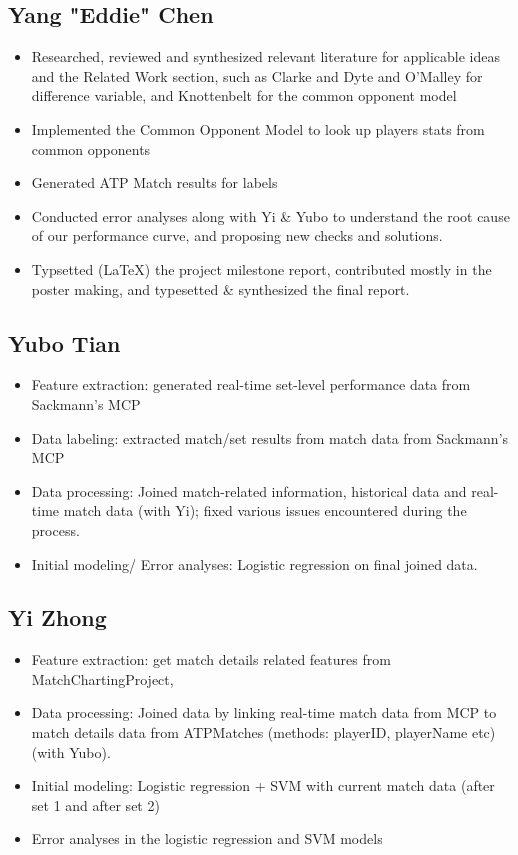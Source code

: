 \documentclass[paper=a4, fontsize=10pt]{scrartcl} %
\numberwithin{equation}{section} %
\numberwithin{figure}{section} %
\numberwithin{table}{section} %
\begin{document}
\subsection{Yang "Eddie" Chen}
\begin{itemize}
\item Researched, reviewed and synthesized relevant literature for applicable ideas and the Related Work section, such as Clarke and Dyte \cite{Clarke2010} and O'Malley \cite{omalley} for difference variable, and Knottenbelt \cite{KNOTTENBELT20123820} for the common opponent model
\item Implemented the Common Opponent Model to look up players stats from common opponents
\item Generated ATP Match results for labels
\item Conducted error analyses along with Yi \& Yubo to understand the root cause of our performance curve, and proposing new checks and solutions. 
\item Typsetted (\LaTeX) the project milestone report, contributed mostly in the poster making, and typesetted \& synthesized the final report. 
\end{itemize}

\subsection{Yubo Tian}
\begin{itemize}
\item Feature extraction:  generated real-time set-level performance data from Sackmann's MCP
\cite{tennis_charting}
\item Data labeling: extracted match/set results from match data from Sackmann's MCP 
\cite{tennis_charting}
\item Data processing: Joined match-related information, historical data and real-time match data (with Yi); fixed various issues encountered during the process.
\item Initial modeling/ Error analyses: Logistic regression on final joined data.
\end{itemize}

\subsection{Yi Zhong}
\begin{itemize}
\item Feature extraction: get match details related features from MatchChartingProject, 
\item Data processing: Joined data by linking real-time match data from MCP \cite{tennis_charting} to match details data from ATPMatches \cite{tennis_atp} (methods: playerID, playerName etc) (with Yubo).
\item Initial modeling: Logistic regression + SVM with current match data (after set 1 and after set 2)
\item Error analyses in the logistic regression and SVM models
\end{itemize}


 
\end{document}
